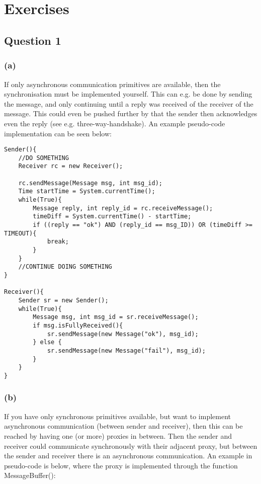\documentclass[12pt,a4paper,fleqn]{article}
\begin{document}
\title{\Module\\\Uebung}
\author{\Studentenname}
\maketitle

\section*{Exercises} 
\label{sec:exercises}

\subsection*{Question 1}
\label{sec:eq1}

\subsubsection*{(a)}

If only asynchronous communication primitives are available, then the synchronisation must be implemented yourself. This can e.g. be done by sending the message, and only continuing until a reply was received of the receiver of the message. This could even be pushed further by that the sender then acknowledges even the reply (see e.g. three-way-handshake). An example pseudo-code implementation can be seen below:

\begin{lstlisting}[basicstyle=\footnotesize,breaklines=true]
Sender(){
	//DO SOMETHING
	Receiver rc = new Receiver();
	
	rc.sendMessage(Message msg, int msg_id);
	Time startTime = System.currentTime();
	while(True){
		Message reply, int reply_id = rc.receiveMessage();
		timeDiff = System.currentTime() - startTime;
		if ((reply == "ok") AND (reply_id == msg_ID)) OR (timeDiff >= TIMEOUT){
			break;
		}
	}
	//CONTINUE DOING SOMETHING
}

Receiver(){
	Sender sr = new Sender();
	while(True){
	 	Message msg, int msg_id = sr.receiveMessage();
	 	if msg.isFullyReceived(){
			sr.sendMessage(new Message("ok"), msg_id);
		} else {
			sr.sendMessage(new Message("fail"), msg_id);
		}
	}
}
\end{lstlisting}


\subsubsection*{(b)}

If you have only synchronous primitives available, but want to implement asynchronous communication (between sender and receiver), then this can be reached by having one (or more) proxies in between. Then the sender and receiver could communicate synchronously with their adjacent proxy, but between the sender and receiver there is an asynchronous communication. An example in pseudo-code is below, where the proxy is implemented through the function MessageBuffer():
\end{document}

